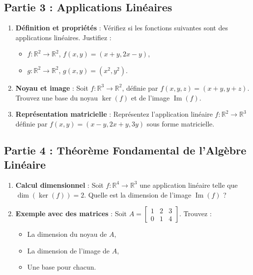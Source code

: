 \subsection*{Partie 3 : Applications Linéaires}
\begin{enumerate}
    \item \textbf{Définition et propriétés} : 
    Vérifiez si les fonctions suivantes sont des applications linéaires. Justifiez :
    \begin{itemize}
        \item \( f : \mathbb{R}^2 \to \mathbb{R}^2 \), \( f(x, y) = (x + y, 2x - y) \),
        \item \( g : \mathbb{R}^2 \to \mathbb{R}^2 \), \( g(x, y) = (x^2, y^2) \).
    \end{itemize}

    \item \textbf{Noyau et image} : 
    Soit \( f : \mathbb{R}^3 \to \mathbb{R}^2 \), définie par \( f(x, y, z) = (x + y, y + z) \). Trouvez une base du noyau \( \ker(f) \) et de l'image \( \operatorname{Im}(f) \).

    \item \textbf{Représentation matricielle} : 
    Représentez l'application linéaire \( f : \mathbb{R}^2 \to \mathbb{R}^3 \) définie par \( f(x, y) = (x - y, 2x + y, 3y) \) sous forme matricielle.
\end{enumerate}

\subsection*{Partie 4 : Théorème Fondamental de l'Algèbre Linéaire}
\begin{enumerate}
    \item \textbf{Calcul dimensionnel} : 
    Soit \( f : \mathbb{R}^4 \to \mathbb{R}^3 \) une application linéaire telle que \( \dim(\ker(f)) = 2 \). Quelle est la dimension de l'image \( \operatorname{Im}(f) \) ?
    
    \item \textbf{Exemple avec des matrices} : 
    Soit \( A = \begin{bmatrix}
    1 & 2 & 3 \\
    0 & 1 & 4
    \end{bmatrix} \). Trouvez :
    \begin{itemize}
        \item La dimension du noyau de \( A \),
        \item La dimension de l'image de \( A \),
        \item Une base pour chacun.
    \end{itemize}
\end{enumerate}

